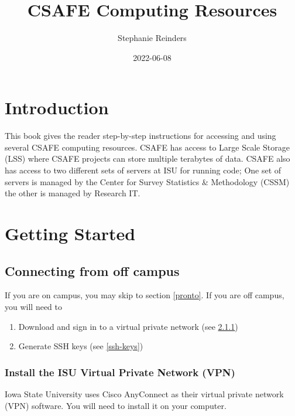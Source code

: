 \documentclass[
]{book}
\title{CSAFE Computing Resources}
\author{Stephanie Reinders}
\date{2022-06-08}
\providecommand{\tightlist}{%
  \setlength{\itemsep}{0pt}\setlength{\parskip}{0pt}}
\begin{document}
\maketitle

{
\setcounter{tocdepth}{1}
\tableofcontents
}
\hypertarget{introduction}{%
\chapter{Introduction}\label{introduction}}

This book gives the reader step-by-step instructions for accessing and using several CSAFE computing resources. CSAFE has access to Large Scale Storage (LSS) where CSAFE projects can store multiple terabytes of data. CSAFE also has access to two different sets of servers at ISU for running code; One set of servers is managed by the Center for Survey Statistics \& Methodology (CSSM) the other is managed by Research IT.

\hypertarget{getting-started}{%
\chapter{Getting Started}\label{getting-started}}

\hypertarget{connecting-from-off-campus}{%
\section{Connecting from off campus}\label{connecting-from-off-campus}}

If you are on campus, you may skip to section \ref{pronto}. If you are off campus, you will need to

\begin{enumerate}
\def\labelenumi{\arabic{enumi}.}
\tightlist
\item
  Download and sign in to a virtual private network (see \ref{install-vpn})
\item
  Generate SSH keys (see \ref{ssh-keys})
\end{enumerate}

\hypertarget{install-vpn}{%
\subsection{Install the ISU Virtual Private Network (VPN)}\label{install-vpn}}

Iowa State University uses Cisco AnyConnect as their virtual private network (VPN) software. You will need to install it on your computer.
\end{document}
